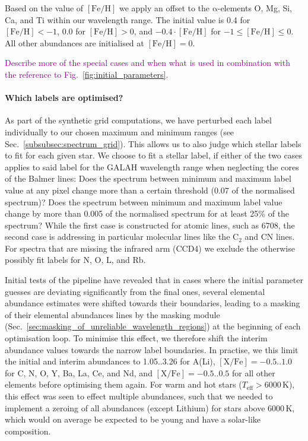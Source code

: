 \documentclass[
  journal=pasa,
  manuscript=research-paper, %
  year=2021,
  volume=37
]{cup-journal}
\newcommand\ion[2]{\text{#1\,\textsc{\lowercase{#2}}}}	%
\newcommand{\SB}[1]{{\textcolor{purple}{#1}}}
\newcommand{\feh}{$\mathrm{[Fe/H]}$\xspace}
\newcommand{\K}{\,\mathrm{K}}	%
\begin{document}
Based on the value of \feh we apply an offset to the $\mathrm{\alpha}$-elements O, Mg, Si, Ca, and Ti within our wavelength range. The initial value is 0.4 for $\mathrm{[Fe/H]} < -1$, 0.0 for $\mathrm{[Fe/H]} > 0$, and $-0.4\cdot \mathrm{[Fe/H]}$ for $-1 \leq \mathrm{[Fe/H]} \leq 0$. All other abundances are initialised at $\mathrm{[Fe/H]} = 0$.

\SB{Describe more of the special cases and when what is used in combination with the reference to Fig.~\ref{fig:initial_parameters}.}

\paragraph{Which labels are optimised?}


As part of the synthetic grid computations, we have perturbed each label individually to our chosen maximum and minimum ranges (see Sec.~\ref{subsubsec:spectrum_grid}). This allows us to also judge which stellar labels to fit for each given star. We choose to fit a stellar label, if either of the two cases applies to said label for the GALAH wavelength range when neglecting the cores of the Balmer lines: Does the spectrum between minimum and maximum label value at any pixel change more than a certain threshold (0.07 of the normalised spectrum)? Does the spectrum between minimum and maximum label value change by more than 0.005 of the normalised spectrum for at least 25\% of the spectrum? While the first case is constructed for atomic lines, such as \ion{Li}{i} 6708, the second case is addressing in particular molecular lines like the $\mathrm{C_2}$ and $\mathrm{CN}$ lines. For spectra that are missing the infrared arm (CCD4) we exclude the otherwise possibly fit labels for N, O, L, and Rb.

Initial tests of the pipeline have revealed that in cases where the initial parameter guesses are deviating significantly from the final ones, several elemental abundance estimates were shifted towards their boundaries, leading to a masking of their elemental abundances lines by the masking module (Sec.~\ref{sec:masking_of_unreliable_wavelength_regions}) at the beginning of each optimisation loop. To minimise this effect, we therefore shift the interim abundance values towards the narrow label boundaries. In practise, we this limit the initial and interim abundances to 1.05..3.26 for A(Li), $\mathrm{[X/Fe]} = -0.5..1.0$ for C, N, O, Y, Ba, La, Ce, and Nd, and $\mathrm{[X/Fe]} = -0.5..0.5$ for all other elements before optimising them again. For warm and hot stars ($T_\text{eff} > 6000\K$), this effect was seen to effect multiple abundances, such that we needed to implement a zeroing of all abundances (except Lithium) for stars above $6000\K$, which would on average be expected to be young and have a solar-like composition.
\end{document}
